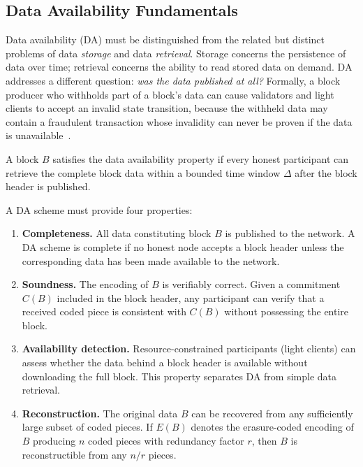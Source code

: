 
\subsection{Data Availability Fundamentals}
\label{subsec:da-fundamentals}

Data availability (DA) must be distinguished from the related but distinct problems of data \emph{storage} and data \emph{retrieval}.
Storage concerns the persistence of data over time; retrieval concerns the ability to read stored data on demand.
DA addresses a different question: \emph{was the data published at all?}
Formally, a block producer who withholds part of a block's data can cause validators and light clients to accept an invalid state transition, because the withheld data may contain a fraudulent transaction whose invalidity can never be proven if the data is unavailable~\cite{AlBassam_FraudDA}.

\begin{definition}
A block $B$ satisfies the data availability property if every honest participant can retrieve the complete block data within a bounded time window $\Delta$ after the block header is published.
\end{definition}

A DA scheme must provide four properties:

\begin{enumerate}
    \item \textbf{Completeness.} All data constituting block $B$ is published to the network. A DA scheme is complete if no honest node accepts a block header unless the corresponding data has been made available to the network.

    \item \textbf{Soundness.} The encoding of $B$ is verifiably correct. Given a commitment $C(B)$ included in the block header, any participant can verify that a received coded piece is consistent with $C(B)$ without possessing the entire block.

    \item \textbf{Availability detection.} Resource-constrained participants (light clients) can assess whether the data behind a block header is available without downloading the full block. This property separates DA from simple data retrieval.

    \item \textbf{Reconstruction.} The original data $B$ can be recovered from any sufficiently large subset of coded pieces. If $E(B)$ denotes the erasure-coded encoding of $B$ producing $n$ coded pieces with redundancy factor $r$, then $B$ is reconstructible from any $n/r$ pieces.
\end{enumerate}

